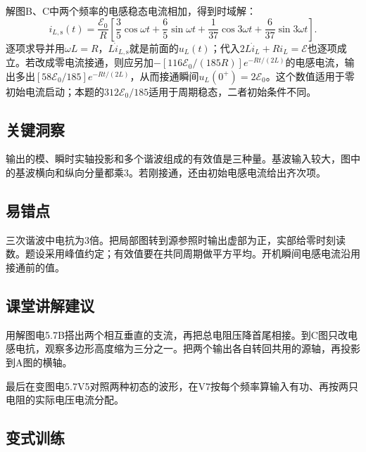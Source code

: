 \documentclass[UTF8,fontset=fandol,a4paper,11pt]{ctexart}
\begin{document}
解图B、C中两个频率的电感稳态电流相加，得到时域解：
\[
i_{L,\mathrm s}(t)=\frac{\mathcal E_0}{R}
\left[\frac35\cos\omega t+\frac65\sin\omega t
+\frac1{37}\cos3\omega t+\frac6{37}\sin3\omega t\right].
\]
逐项求导并用$\omega L=R$，$L\dot i_{L,\mathrm s}$就是前面的$u_L(t)$；代入$2L\dot i_L+Ri_L=\mathcal E$也逐项成立。若改成零电流接通，则应另加$-[116\mathcal E_0/(185R)]e^{-Rt/(2L)}$的电感电流，输出多出$[58\mathcal E_0/185]e^{-Rt/(2L)}$，从而接通瞬间$u_L(0^+)=2\mathcal E_0$。这个数值适用于零初始电流启动；本题的$312\mathcal E_0/185$适用于周期稳态，二者初始条件不同。




\subsection*{关键洞察}

输出的模、瞬时实轴投影和多个谐波组成的有效值是三种量。基波输入较大，图中的基波横向和纵向分量都乘3。若刚接通，还由初始电感电流给出齐次项。



\subsection*{易错点}

三次谐波中电抗为3倍。把局部图转到源参照时输出虚部为正，实部给零时刻读数。题设采用峰值约定；有效值要在共同周期做平方平均。开机瞬间电感电流沿用接通前的值。



\subsection*{课堂讲解建议}

用解图电5.7B搭出两个相互垂直的支流，再把总电阻压降首尾相接。到C图只改电感电抗，观察多边形高度缩为三分之一。把两个输出各自转回共用的源轴，再投影到A图的横轴。

最后在变图电5.7V5对照两种初态的波形，在V7按每个频率算输入有功、再按两只电阻的实际电压电流分配。


\subsection*{变式训练}
\end{document}
